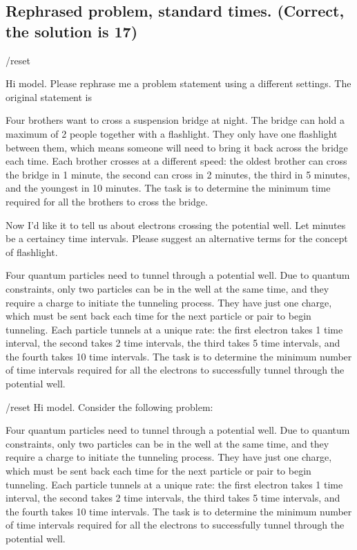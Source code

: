 \subsection{Rephrased problem, standard times. (Correct, the solution is 17)}

\begin{ai}
/reset

Hi model. Please rephrase me a problem statement using a different settings. The
original statement is

\vsp
Four brothers want to cross a suspension bridge at night. The bridge can hold a
maximum of 2 people together with a flashlight. They only have one flashlight
between them, which means someone will need to bring it back across the bridge
each time. Each brother crosses at a different speed: the oldest brother can
cross the bridge in 1 minute, the second can cross in 2 minutes, the third in 5
minutes, and the youngest in 10 minutes.
The task is to determine the minimum time required for all the brothers to cross
the bridge.
\vsp

Now I'd like it to tell us about electrons crossing the potential well. Let
minutes be a certaincy time intervals. Please
suggest an alternative terms for the concept of flashlight.

\end{ai}

\begin{airesult}
\problem

\vsp

Four quantum particles need to tunnel through a potential well. Due to quantum
constraints, only two particles can be in the well at the same time, and they
require a charge to initiate the tunneling process. They have just
one charge, which must be sent back each time for the next particle or pair
to begin tunneling. Each particle tunnels at a unique rate: the first electron
takes 1 time interval, the second takes 2 time intervals, the third takes 5 time
intervals, and the fourth takes 10 time intervals. The task is to determine the
minimum number of time intervals required for all the electrons to successfully
tunnel through the potential well.

\vsp
\end{airesult}


\begin{ai}
/reset
Hi model. Consider the following problem:

Four quantum particles need to tunnel through a potential well. Due to quantum
constraints, only two particles can be in the well at the same time, and they
require a charge to initiate the tunneling process. They have just
one charge, which must be sent back each time for the next particle or pair
to begin tunneling. Each particle tunnels at a unique rate: the first electron
takes 1 time interval, the second takes 2 time intervals, the third takes 5 time
intervals, and the fourth takes 10 time intervals. The task is to determine the
minimum number of time intervals required for all the electrons to successfully
tunnel through the potential well.
\end{ai}

